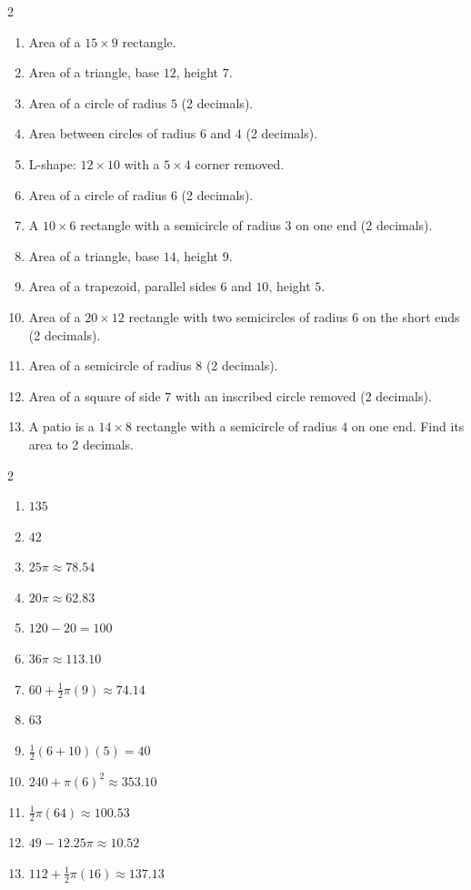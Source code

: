 \documentclass[11pt]{article}
\begin{document}
\begin{recapbox}
\begin{multicols}{2}
\small
\begin{enumerate}[leftmargin=*,itemsep=3pt]
  \item Area of a $15\times9$ rectangle.
  \item Area of a triangle, base $12$, height $7$.
  \item Area of a circle of radius $5$ (2 decimals).
  \item Area between circles of radius $6$ and $4$ (2 decimals).
  \item L-shape: $12\times10$ with a $5\times4$ corner removed.
  \item Area of a circle of radius $6$ (2 decimals).
  \item A $10\times6$ rectangle with a semicircle of radius $3$ on one end (2 decimals).
  \item Area of a triangle, base $14$, height $9$.
  \item Area of a trapezoid, parallel sides $6$ and $10$, height $5$.
  \item Area of a $20\times12$ rectangle with two semicircles of radius $6$ on the short ends (2 decimals).
  \item Area of a semicircle of radius $8$ (2 decimals).
  \item Area of a square of side $7$ with an inscribed circle removed (2 decimals).
  \item A patio is a $14\times8$ rectangle with a semicircle of radius $4$ on one end. Find its area to 2 decimals.
\end{enumerate}
\end{multicols}
\end{recapbox}

\begin{keybox}
\begin{multicols}{2}
\small
\begin{enumerate}[leftmargin=*,itemsep=3pt]
  \item $135$
  \item $42$
  \item $25\pi\approx78.54$
  \item $20\pi\approx62.83$
  \item $120-20=100$
  \item $36\pi\approx113.10$
  \item $60+\tfrac12\pi(9)\approx74.14$
  \item $63$
  \item $\tfrac12(6+10)(5)=40$
  \item $240+\pi(6)^2\approx353.10$
  \item $\tfrac12\pi(64)\approx100.53$
  \item $49-12.25\pi\approx10.52$
  \item $112+\tfrac12\pi(16)\approx137.13$
\end{enumerate}
\end{multicols}
\end{keybox}
\end{document}
